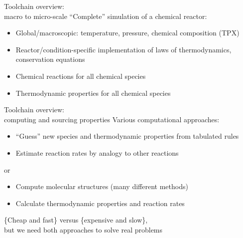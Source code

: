 \begin{frame}{Toolchain overview:\\ macro to micro-scale}
``Complete'' simulation of a chemical reactor:

\vspace{0.5cm}

 \begin{itemize}
  \item Global/macroscopic: temperature, pressure, chemical composition (TPX)
  \item Reactor/condition-specific implementation of laws of thermodynamics, conservation equations
  \item Chemical reactions for all chemical species
  \item Thermodynamic properties for all chemical species
 \end{itemize}
\end{frame}

\begin{frame}{Toolchain overview:\\ computing and sourcing properties}
Various computational approaches:

\vspace{0.5cm}

 \begin{itemize}
  \item ``Guess'' new species and thermodynamic properties from tabulated rules
  \item Estimate reaction rates by analogy to other reactions
 \end{itemize}
 
 or
 
 \begin{itemize}
  \item Compute molecular structures (many different methods)
  \item Calculate thermodynamic properties and reaction rates
 \end{itemize}
 
 \vspace{0.5cm}
 
 \{Cheap and fast\} versus \{expensive and slow\},\\
 but we need both approaches to solve real problems
\end{frame}

